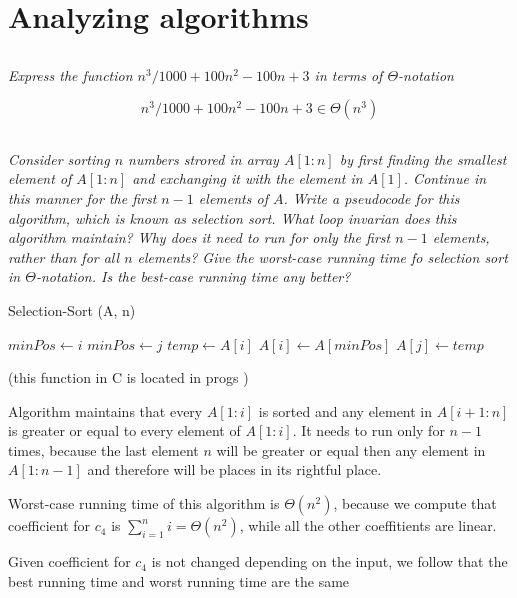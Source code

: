 \documentclass[11pt,oneside,titlepage]{book}
\begin{document}
\section{Analyzing algorithms}

\subsection{}

\textit{Express the function $n^3/1000 + 100n^2 - 100n + 3$ in terms of $\Theta$-notation}

$$n^3/1000 + 100n^2 - 100n + 3 \in \Theta(n^3)$$

\subsection{}

\textit{Consider sorting $n$ numbers strored in array $A[1: n]$ by first finding the smallest
  element of $A[1:n]$ and exchanging it with the element in $A[1]$. Continue in this manner for
  the first $n - 1$ elements of $A$. Write a pseudocode for this algorithm, which is known as
  selection sort. What loop invarian does this algorithm maintain? Why does it need to run
  for only the first $n - 1$ elements, rather than for all $n$ elements? Give the worst-case
  running time fo selection sort in $\Theta$-notation. Is the best-case running time
  any better?}


\begin{function}
  \caption{Selection-Sort (A, n)}
   {
    $minPos \leftarrow i$\;
     {
       {
        $minPos \leftarrow j$
      }
    }
    $temp \leftarrow A[i]$\;
    $A[i] \leftarrow A[minPos]$\;
    $A[j] \leftarrow temp$\;
  }
\end{function}

(this function in C is located in progs )

Algorithm maintains that every $A[1:i]$ is sorted and any element in  $A[i + 1:n]$ is greater
or equal to every element of $A[1:i]$. It needs to run only for $n - 1$ times, because the last
element $n$ will be greater or equal then any element in $A[1:n - 1]$ and therefore will
be places in its rightful place.

Worst-case running time of this algorithm is $\Theta(n^2)$, because we compute that
coefficient for $c_4$ is $\sum_{i = 1}^n i = \Theta(n^2)$, while all the other coeffitients
are linear.

Given coefficient for $c_4$ is not changed depending on the input, we follow that
the best running time and worst running time are the same
\end{document}
